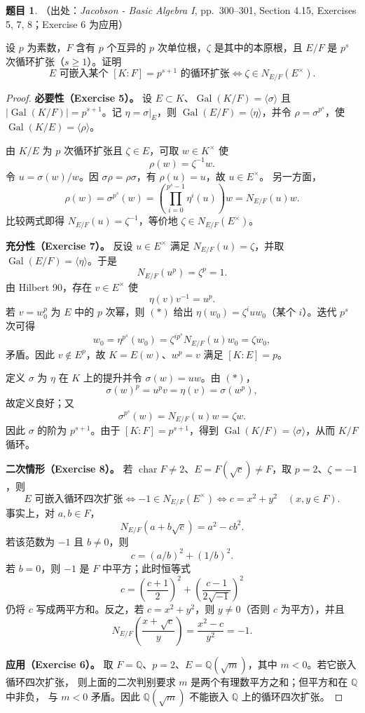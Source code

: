 \documentclass[a4paper]{ctexart}
\theoremstyle{definition}
\newtheorem{example}{题目}[section]
\theoremstyle{analysis}
\theoremstyle{plain}
\begin{document}
\begin{example}
（出处：\textit{Jacobson - Basic Algebra I}, pp.~300--301, Section 4.15, Exercises 5, 7, 8；Exercise 6 为应用）

设 \(p\) 为素数，\(F\) 含有 \(p\) 个互异的 \(p\) 次单位根，\(\zeta\) 是其中的本原根，且
\(E/F\) 是 \(p^s\) 次循环扩张（\(s\ge1\)）。证明
\[
 E\text{ 可嵌入某个 }[K:F]=p^{s+1}\text{ 的循环扩张}
 \iff
 \zeta\in N_{E/F}(E^\times).
\]

\begin{proof}
\textbf{必要性（Exercise 5）。}
设 \(E\subset K\)、\(\operatorname{Gal}(K/F)=\langle\sigma\rangle\) 且
\(|\operatorname{Gal}(K/F)|=p^{s+1}\)。记 \(\eta=\sigma|_E\)，则
\(\operatorname{Gal}(E/F)=\langle\eta\rangle\)，并令 \(\rho=\sigma^{p^s}\)，使
\(\operatorname{Gal}(K/E)=\langle\rho\rangle\)。

由 \(K/E\) 为 \(p\) 次循环扩张且 \(\zeta\in E\)，可取 \(w\in K^\times\) 使
\[
  \rho(w)=\zeta^{-1}w.
\]
令 \(u=\sigma(w)/w\)。因 \(\sigma\rho=\rho\sigma\)，有 \(\rho(u)=u\)，故 \(u\in E^\times\)。
另一方面，
\[
  \rho(w)=\sigma^{p^s}(w)
  =\left(\prod_{i=0}^{p^s-1}\eta^i(u)\right)w
  =N_{E/F}(u)w.
\]
比较两式即得 \(N_{E/F}(u)=\zeta^{-1}\)，等价地 \(\zeta\in N_{E/F}(E^\times)\)。

\textbf{充分性（Exercise 7）。}
反设 \(u\in E^\times\) 满足 \(N_{E/F}(u)=\zeta\)，并取
\(\operatorname{Gal}(E/F)=\langle\eta\rangle\)。于是
\[
  N_{E/F}(u^p)=\zeta^p=1.
\]
由 Hilbert 90，存在 \(v\in E^\times\) 使
\[
  \eta(v)v^{-1}=u^p. \tag{*}
\]
若 \(v=w_0^p\) 为 \(E\) 中的 \(p\) 次幂，则 \((*)\) 给出
\(\eta(w_0)=\zeta^iuw_0\)（某个 \(i\)）。迭代 \(p^s\) 次可得
\[
  w_0=\eta^{p^s}(w_0)=\zeta^{ip^s}N_{E/F}(u)w_0=\zeta w_0,
\]
矛盾。因此 \(v\notin E^p\)，故 \(K=E(w)\)、\(w^p=v\) 满足 \([K:E]=p\)。

定义 \(\sigma\) 为 \(\eta\) 在 \(K\) 上的提升并令 \(\sigma(w)=uw\)。由 \((*)\)，
\[
  \sigma(w)^p=u^pv=\eta(v)=\sigma(w^p),
\]
故定义良好；又
\[
  \sigma^{p^s}(w)=N_{E/F}(u)w=\zeta w.
\]
因此 \(\sigma\) 的阶为 \(p^{s+1}\)。由于 \([K:F]=p^{s+1}\)，得到
\(\operatorname{Gal}(K/F)=\langle\sigma\rangle\)，从而 \(K/F\) 循环。

\textbf{二次情形（Exercise 8）。}
若 \(\operatorname{char}F\ne2\)、\(E=F(\sqrt c)\ne F\)，取 \(p=2\)、\(\zeta=-1\)，则
\[
  E\text{ 可嵌入循环四次扩张}
  \iff
  -1\in N_{E/F}(E^\times)
  \iff
  c=x^2+y^2\quad(x,y\in F).
\]
事实上，对 \(a,b\in F\)，
\[
  N_{E/F}(a+b\sqrt c)=a^2-cb^2.
\]
若该范数为 \(-1\) 且 \(b\ne0\)，则
\[
  c=(a/b)^2+(1/b)^2.
\]
若 \(b=0\)，则 \(-1\) 是 \(F\) 中平方；此时恒等式
\[
  c=\left(\frac{c+1}{2}\right)^2+
    \left(\frac{c-1}{2\sqrt{-1}}\right)^2
\]
仍将 \(c\) 写成两平方和。反之，若 \(c=x^2+y^2\)，则 \(y\ne0\)（否则 \(c\) 为平方），并且
\[
  N_{E/F}\left(\frac{x+\sqrt c}{y}\right)
  =\frac{x^2-c}{y^2}=-1.
\]

\textbf{应用（Exercise 6）。}
取 \(F=\mathbb Q\)、\(p=2\)、\(E=\mathbb Q(\sqrt m)\)，其中 \(m<0\)。若它嵌入循环四次扩张，
则上面的二次判别要求 \(m\) 是两个有理数平方之和；但平方和在 \(\mathbb Q\) 中非负，
与 \(m<0\) 矛盾。因此 \(\mathbb Q(\sqrt m)\) 不能嵌入 \(\mathbb Q\) 上的循环四次扩张。
\end{proof}
\end{example}
\end{document}
